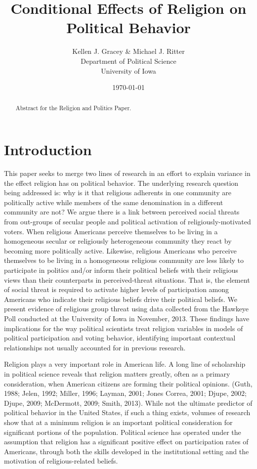 \documentclass{article}
\author{Kellen J. Gracey \& Michael J. Ritter \\
        Department of Political Science \\
        University of Iowa}
\date{\today}
\title{Conditional Effects of Religion on Political Behavior}
\begin{document}

\maketitle

\begin{abstract}

Abstract for the Religion and Politics Paper.

\end{abstract}

\section*{Introduction}

This paper seeks to merge two lines of research in an effort to explain variance in the effect religion has on political behavior.  The underlying research question being addressed is: why is it that religious adherents in one community are politically active while members of the same denomination in a different community are not?  We argue there is a link between perceived social threats from out-groups of secular people and political activation of religiously-motivated voters.  When religious Americans perceive themselves to be living in a homogeneous secular or religiously heterogeneous community they react by becoming more politically active.  Likewise, religious Americans who perceive themselves to be living in a homogeneous religious community are less likely to participate in politics and/or inform their political beliefs with their religious views than their counterparts in perceived-threat situations.  That is, the element of social threat is required to activate higher levels of participation among Americans who indicate their religious beliefs drive their political beliefs.  We present evidence of religious group threat using data collected from the Hawkeye Poll conducted at the University of Iowa in November, 2013.  These findings have implications for the way political scientists treat religion variables in models of political participation and voting behavior, identifying important contextual relationships not usually accounted for in previous research.

Religion plays a very important role in American life.  A long line of scholarship in political science reveals that religion matters greatly, often as a primary consideration, when American citizens are forming their political opinions.  (Guth, 1988; Jelen, 1992; Miller, 1996; Layman, 2001; Jones Correa, 2001; Djupe, 2002; Djupe, 2009; McDermott, 2009; Smith, 2013).  While not the ultimate predictor of political behavior in the United States, if such a thing exists, volumes of research show that at a minimum religion is an important political consideration for significant portions of the population.  Political science has operated under the assumption that religion has a significant positive effect on participation rates of Americans, through both the skills developed in the institutional setting and the motivation of religious-related beliefs. 
\end{document}
